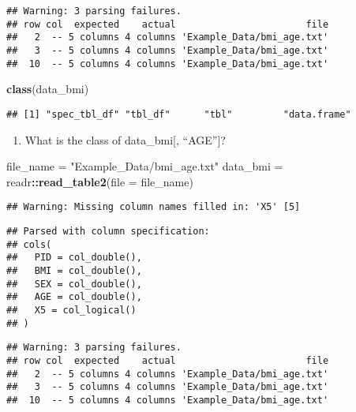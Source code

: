 \documentclass[]{article}
\newenvironment{Shaded}{\begin{snugshade}}{\end{snugshade}}
\newcommand{\DataTypeTok}[1]{\textcolor[rgb]{0.13,0.29,0.53}{#1}}
\newcommand{\KeywordTok}[1]{\textcolor[rgb]{0.13,0.29,0.53}{\textbf{#1}}}
\newcommand{\NormalTok}[1]{#1}
\newcommand{\OperatorTok}[1]{\textcolor[rgb]{0.81,0.36,0.00}{\textbf{#1}}}
\newcommand{\StringTok}[1]{\textcolor[rgb]{0.31,0.60,0.02}{#1}}
\providecommand{\tightlist}{%
  \setlength{\itemsep}{0pt}\setlength{\parskip}{0pt}}
\begin{document}
\begin{verbatim}
## Warning: 3 parsing failures.
## row col  expected    actual                       file
##   2  -- 5 columns 4 columns 'Example_Data/bmi_age.txt'
##   3  -- 5 columns 4 columns 'Example_Data/bmi_age.txt'
##  10  -- 5 columns 4 columns 'Example_Data/bmi_age.txt'
\end{verbatim}

\begin{Shaded}
\begin{Highlighting}[]
\KeywordTok{class}\NormalTok{(data_bmi)}
\end{Highlighting}
\end{Shaded}

\begin{verbatim}
## [1] "spec_tbl_df" "tbl_df"      "tbl"         "data.frame"
\end{verbatim}

\begin{enumerate}
\def\labelenumi{\alph{enumi}.}
\setcounter{enumi}{1}
\tightlist
\item
  What is the class of data\_bmi{[}, ``AGE''{]}?
\end{enumerate}

\begin{Shaded}
\begin{Highlighting}[]
\NormalTok{file_name =}\StringTok{ "Example_Data/bmi_age.txt"}
\NormalTok{data_bmi =}\StringTok{ }\NormalTok{readr}\OperatorTok{::}\KeywordTok{read_table2}\NormalTok{(}\DataTypeTok{file =}\NormalTok{ file_name)}
\end{Highlighting}
\end{Shaded}

\begin{verbatim}
## Warning: Missing column names filled in: 'X5' [5]
\end{verbatim}

\begin{verbatim}
## Parsed with column specification:
## cols(
##   PID = col_double(),
##   BMI = col_double(),
##   SEX = col_double(),
##   AGE = col_double(),
##   X5 = col_logical()
## )
\end{verbatim}

\begin{verbatim}
## Warning: 3 parsing failures.
## row col  expected    actual                       file
##   2  -- 5 columns 4 columns 'Example_Data/bmi_age.txt'
##   3  -- 5 columns 4 columns 'Example_Data/bmi_age.txt'
##  10  -- 5 columns 4 columns 'Example_Data/bmi_age.txt'
\end{verbatim}
\end{document}
